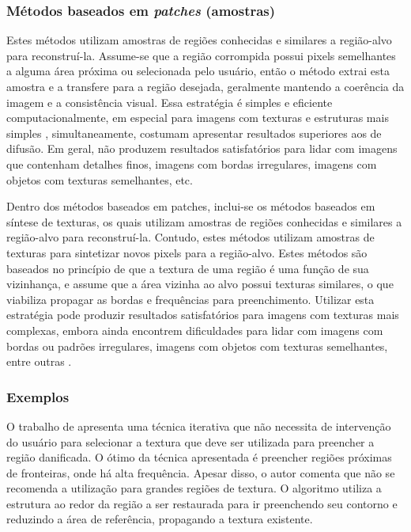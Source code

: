 \subsubsection{Métodos baseados em \emph{patches} (amostras)} \label{sample}
Estes métodos utilizam amostras de regiões conhecidas e similares a região-alvo para reconstruí-la. Assume-se que a região corrompida possui pixels semelhantes a alguma área próxima ou selecionada pelo usuário, então o método extrai esta amostra e a transfere para a região desejada, geralmente mantendo a coerência da imagem e a consistência visual. Essa estratégia é simples e eficiente computacionalmente, em especial para imagens com texturas e estruturas mais simples \cite{patchmatch2009}, simultaneamente, costumam apresentar resultados superiores aos de difusão. Em geral, não produzem resultados satisfatórios para lidar com imagens que contenham detalhes finos, imagens com bordas irregulares, imagens com objetos com texturas semelhantes, etc.

Dentro dos métodos baseados em patches, inclui-se os métodos baseados em síntese de texturas, os quais utilizam amostras de regiões conhecidas e similares a região-alvo para reconstruí-la. Contudo, estes métodos utilizam amostras de texturas para sintetizar novos pixels para a região-alvo. Estes métodos são baseados no princípio de que a textura de uma região é uma função de sua vizinhança, e assume que a área vizinha ao alvo possui texturas similares, o que viabiliza propagar as bordas e frequências para preenchimento. Utilizar esta estratégia pode produzir resultados satisfatórios para imagens com texturas mais complexas, embora ainda encontrem dificuldades para lidar com imagens com bordas ou padrões irregulares, imagens com objetos com texturas semelhantes, entre outras \cite{bertalmio2003texture}.

\subsubsection{Exemplos}

O trabalho de \cite{Bertalmio2000} apresenta uma técnica iterativa que não necessita de intervenção do usuário para selecionar a textura que deve ser utilizada para preencher a região danificada. O ótimo da técnica apresentada é preencher regiões próximas de fronteiras, onde há alta frequência. Apesar disso, o autor comenta que não se recomenda a utilização para grandes regiões de textura. O algoritmo utiliza a estrutura ao redor da região a ser restaurada para ir preenchendo seu contorno e reduzindo a área de referência, propagando a textura existente.

